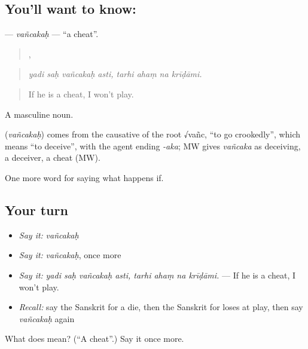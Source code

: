 \subsection*{You'll want to know: }
\textbf{} — \emph{vañcakaḥ} — \textquotedblleft{}a cheat\textquotedblright{}.

\begin{quote}
   ,    
\end{quote}

\begin{quote}
\emph{yadi saḥ vañcakaḥ asti, tarhi ahaṃ na krīḍāmi.}
\end{quote}

\begin{quote}
If he is a cheat, I won't play.
\end{quote}

A masculine noun.

\begin{cousinweb}
\textbf{} (\emph{vañcakaḥ}) comes from the causative of the root √vañc, \textquotedblleft{}to go crookedly\textquotedblright{}, which means \textquotedblleft{}to deceive\textquotedblright{}, with the agent ending \emph{-aka}; MW gives \emph{vañcaka} as deceiving, a deceiver, a cheat (MW).
\end{cousinweb}

\begin{grammarlens}[title={What you've built}]
One more word for saying what happens if.
\end{grammarlens}

\subsection*{Your turn}
\begin{itemize}
\raggedright
  \item \emph{Say it:} \emph{vañcakaḥ}
  \item \emph{Say it:} \emph{vañcakaḥ}, once more
  \item \emph{Say it:} \emph{yadi saḥ vañcakaḥ asti, tarhi ahaṃ na krīḍāmi.} — If he is a cheat, I won't play.
  \item \emph{Recall:} say the Sanskrit for a die, then the Sanskrit for loses at play, then say \emph{vañcakaḥ} again
\end{itemize}

\begin{tcolorbox}[breakable,colback=teal!4,colframe=teal!35!black,title={Before you move on}]
What does  mean? (\textquotedblleft{}A cheat\textquotedblright{}.) Say it once more.
\end{tcolorbox}
